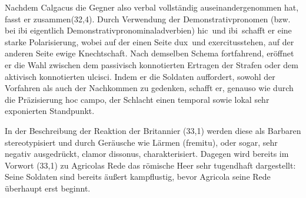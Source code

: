 \documentclass[12pt]{article}
\begin{document}
	Nachdem Calgacus die Gegner also verbal vollständig auseinandergenommen hat, fasst er zusammen(32,4). Durch Verwendung der Demonstrativpronomen (bzw. bei ibi eigentlich Demonstrativpronominaladverbien) \glqq hic\grqq\ und \glqq ibi\grqq\ schafft er eine starke Polarisierung, wobei auf der einen Seite \glqq dux\grqq\ und \glqq exercitus\grqq stehen, auf der anderen Seite ewige Knechtschaft. Nach demselben Schema fortfahrend, eröffnet er die Wahl zwischen dem passivisch konnotierten Ertragen der Strafen oder dem aktivisch konnotierten \glqq ulcisci\grqq. Indem er die Soldaten auffordert, sowohl der Vorfahren als auch der Nachkommen zu gedenken, schafft er, genauso wie durch die Präzisierung \glqq hoc campo\grqq, der Schlacht einen temporal sowie lokal sehr exponierten Standpunkt.
	
	In der Beschreibung der Reaktion der Britannier (33,1) werden diese als Barbaren stereotypisiert und durch Geräusche wie Lärmen (\glqq fremitu\grqq), oder sogar, sehr negativ ausgedrückt, \glqq clamor dissonus\grqq, charakterisiert. Dagegen wird bereits im Vorwort (33,1) zu Agricolas Rede das römische Heer sehr tugendhaft dargestellt: Seine Soldaten sind bereits äußert kampflustig, bevor Agricola seine Rede überhaupt erst beginnt.
\end{document}
